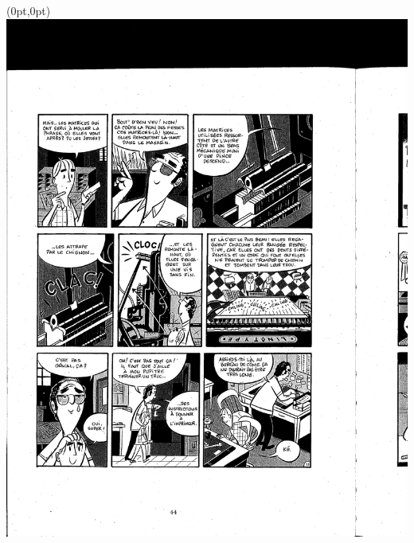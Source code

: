 \begin{textblock*}{440pt}(0pt,0pt)
  \includegraphics[angle=180]{paul-apprenti-typographe/paul-page_3}
\end{textblock*}
\null\clearpage

